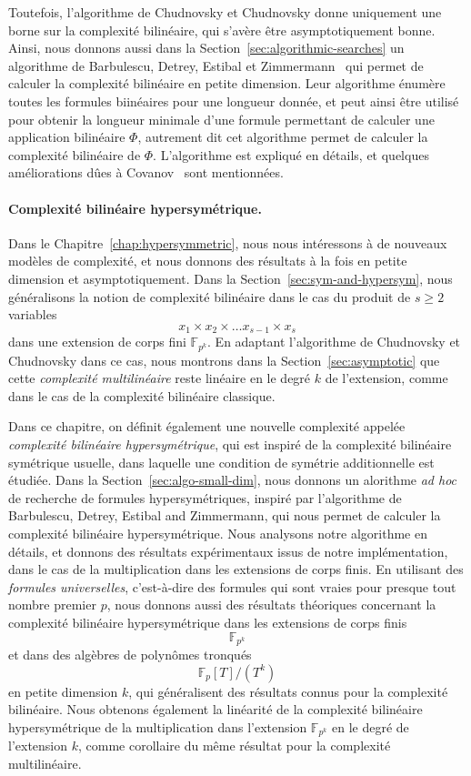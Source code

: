 Toutefois, l'algorithme de Chudnovsky et Chudnovsky donne uniquement une borne
sur la complexité bilinéaire, qui s'avère être asymptotiquement bonne. Ainsi,
nous donnons aussi dans la Section~\ref{sec:algorithmic-searches} un algorithme
de Barbulescu, Detrey, Estibal et Zimmermann~\cite{BDEZ12} qui permet de
calculer la complexité bilinéaire en petite dimension. Leur algorithme énumère
toutes les formules biinéaires pour une longueur donnée, et peut ainsi être
utilisé pour obtenir la longueur minimale d'une formule permettant de calculer
une application bilinéaire $\Phi$, autrement dit cet algorithme permet de
calculer la complexité bilinéaire de $\Phi$. L'algorithme est expliqué en
détails, et quelques améliorations dûes à Covanov~\cite{Covanov19} sont
mentionnées.

\paragraph{Complexité bilinéaire hypersymétrique.} Dans le
Chapitre~\ref{chap:hypersymmetric}, nous nous intéressons à de nouveaux modèles
de complexité, et nous donnons des résultats à la fois en petite dimension et
asymptotiquement. Dans la Section~\ref{sec:sym-and-hypersym}, nous généralisons
la notion de complexité bilinéaire dans le cas du produit de $s\geq2$ variables
\[
  x_1\times x_2 \times\dots x_{s-1}\times x_s
\]
dans une extension de corps fini $\mathbb{F}_{p^{k}}$. En adaptant l'algorithme
de Chudnovsky et Chudnovsky dans ce cas, nous montrons dans la
Section~\ref{sec:asymptotic} que cette \emph{complexité multilinéaire} reste
linéaire en le degré $k$ de l'extension, comme dans le cas de la complexité
bilinéaire classique.

Dans ce chapitre, on définit également une nouvelle complexité appelée
\emph{complexité bilinéaire hypersymétrique}, qui est inspiré de la complexité
bilinéaire symétrique usuelle, dans laquelle une condition de symétrie
additionnelle est étudiée. Dans la Section~\ref{sec:algo-small-dim}, nous
donnons un alorithme \emph{ad hoc} de recherche
de formules hypersymétriques, inspiré par l'algorithme de Barbulescu, Detrey,
Estibal and Zimmermann, qui nous permet de calculer la complexité bilinéaire
hypersymétrique. Nous analysons notre algorithme en détails, et donnons des
résultats expérimentaux issus de notre implémentation, dans le cas de la
multiplication dans les extensions de corps finis. En utilisant des
\emph{formules universelles}, c'est-à-dire des formules qui sont vraies pour
presque tout nombre premier $p$, nous donnons aussi des résultats théoriques
concernant la complexité bilinéaire hypersymétrique dans les extensions de corps
finis
\[
  \mathbb{F}_{p^{k}}
\]
et dans des algèbres de polynômes tronqués
\[
  \mathbb{F}_p[T]/(T^k)
\]
en petite dimension $k$, qui généralisent des résultats connus pour la
complexité bilinéaire. Nous obtenons également la linéarité de la complexité
bilinéaire hypersymétrique de la multiplication dans l'extension
$\mathbb{F}_{p^{k}}$ en le degré de l'extension $k$, comme corollaire du même
résultat pour la complexité multilinéaire.


